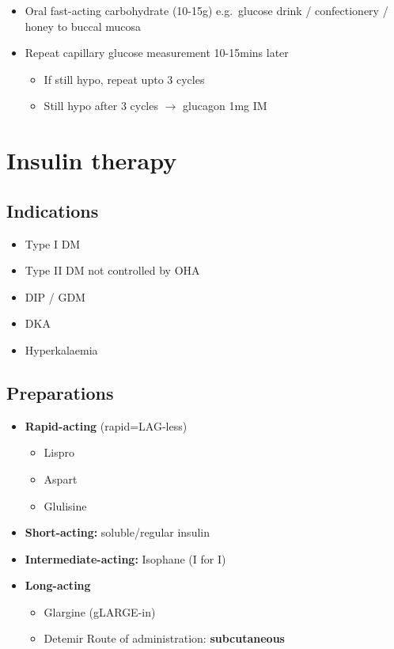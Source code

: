 \documentclass[
  12pt,
]{memoir}
\providecommand{\tightlist}{%
  \setlength{\itemsep}{0pt}\setlength{\parskip}{0pt}}
\begin{document}
\begin{itemize}
\tightlist
\item
  Oral fast-acting carbohydrate (10-15g) e.g.~glucose drink /
  confectionery / honey to buccal mucosa
\item
  Repeat capillary glucose measurement 10-15mins later

  \begin{itemize}
  \tightlist
  \item
    If still hypo, repeat upto 3 cycles
  \item
    Still hypo after 3 cycles \(\rightarrow\) glucagon 1mg IM
  \end{itemize}
\end{itemize}

\pagebreak

\hypertarget{insulin-therapy}{%
\section{Insulin therapy}\label{insulin-therapy}}

\hypertarget{indications}{%
\subsection{Indications}\label{indications}}

\begin{itemize}
\tightlist
\item
  Type I DM
\item
  Type II DM not controlled by OHA
\item
  DIP / GDM
\item
  DKA
\item
  Hyperkalaemia
\end{itemize}

\hypertarget{preparations}{%
\subsection{Preparations}\label{preparations}}

\begin{itemize}
\tightlist
\item
  \textbf{Rapid-acting} (rapid=LAG-less)

  \begin{itemize}
  \tightlist
  \item
    Lispro
  \item
    Aspart
  \item
    Glulisine
  \end{itemize}
\item
  \textbf{Short-acting:} soluble/regular insulin
\item
  \textbf{Intermediate-acting:} Isophane (I for I)
\item
  \textbf{Long-acting}

  \begin{itemize}
  \tightlist
  \item
    Glargine (gLARGE-in)
  \item
    Detemir Route of administration: \textbf{subcutaneous}
  \end{itemize}
\end{itemize}
\end{document}
